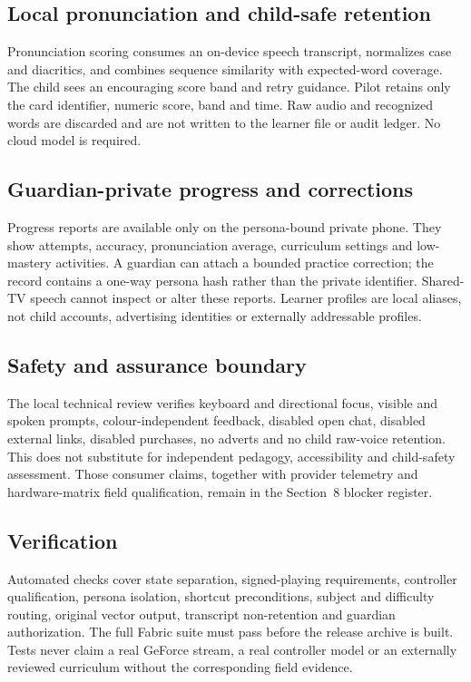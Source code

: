 \subsection{Local pronunciation and child-safe retention}

Pronunciation scoring consumes an on-device speech transcript, normalizes case and
diacritics, and combines sequence similarity with expected-word coverage.  The child sees
an encouraging score band and retry guidance.  Pilot retains only the card identifier,
numeric score, band and time.  Raw audio and recognized words are discarded and are not
written to the learner file or audit ledger.  No cloud model is required.

\subsection{Guardian-private progress and corrections}

Progress reports are available only on the persona-bound private phone.  They show
attempts, accuracy, pronunciation average, curriculum settings and low-mastery activities.
A guardian can attach a bounded practice correction; the record contains a one-way persona
hash rather than the private identifier.  Shared-TV speech cannot inspect or alter these
reports.  Learner profiles are local aliases, not child accounts, advertising identities
or externally addressable profiles.

\subsection{Safety and assurance boundary}

The local technical review verifies keyboard and directional focus, visible and spoken
prompts, colour-independent feedback, disabled open chat, disabled external links,
disabled purchases, no adverts and no child raw-voice retention.  This does not substitute
for independent pedagogy, accessibility and child-safety assessment.  Those consumer
claims, together with provider telemetry and hardware-matrix field qualification, remain
in the Section~8 blocker register.

\subsection{Verification}

Automated checks cover state separation, signed-playing requirements, controller
qualification, persona isolation, shortcut preconditions, subject and difficulty routing,
original vector output, transcript non-retention and guardian authorization.  The full
Fabric suite must pass before the release archive is built.  Tests never claim a real
GeForce stream, a real controller model or an externally reviewed curriculum without the
corresponding field evidence.

